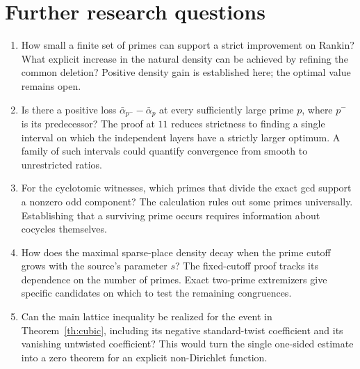 \documentclass[11pt,letterpaper]{article}
\begin{document}
\section{Further research questions}
\begin{enumerate}
\item How small a finite set of primes can support a strict improvement on Rankin? What explicit increase in the natural density can be achieved by refining the common deletion? Positive density gain is established here; the optimal value remains open.
\item Is there a positive loss $\bar\alpha_{p^-}-\bar\alpha_p$ at every sufficiently large prime $p$, where $p^-$ is its predecessor? The proof at $11$ reduces strictness to finding a single interval on which the independent layers have a strictly larger optimum. A family of such intervals could quantify convergence from smooth to unrestricted ratios.
\item For the cyclotomic witnesses, which primes that divide the exact gcd support a nonzero odd component? The calculation rules out some primes universally. Establishing that a surviving prime occurs requires information about cocycles themselves.
\item How does the maximal sparse-place density decay when the prime cutoff grows with the source's parameter $s$? The fixed-cutoff proof tracks its dependence on the number of primes. Exact two-prime extremizers give specific candidates on which to test the remaining congruences.
\item Can the main lattice inequality be realized for the event in Theorem~\ref{th:cubic}, including its negative standard-twist coefficient and its vanishing untwisted coefficient? This would turn the single one-sided estimate into a zero theorem for an explicit non-Dirichlet function.
\end{enumerate}
\end{document}
